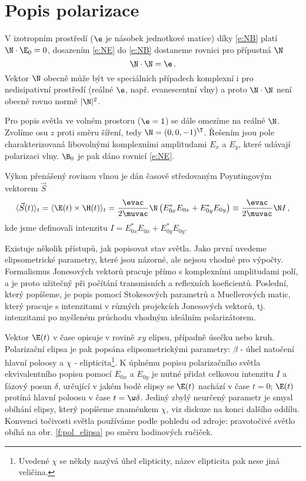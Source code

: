 \section{Popis polarizace}

V izotropním prostředí ($\e$ je násobek jednotkové matice) díky \eqref{e:NB} platí $\N \cdot \E_0=0$, dosazením \eqref{e:NE} do \eqref{e:NB} dostaneme rovnici pro přípustná $\N$
\begin{equation}
\N \cdot \N =\e \,.
\end{equation}
Vektor $\N$ obecně může být ve speciálních případech komplexní i pro nedisipativní prostředí (reálné $\e$, např. evanescentní vlny) a proto $\N \cdot \N$ není obecně rovno normě $|\N|^2$.

Pro popis světla ve volném prostoru ($\e=1$) se dále omezíme na reálné $\N$.
Zvolíme osu $z$ proti směru šíření, tedy $\N=(0,0,-1)^\T$.
Řešením jsou pole charakterizovaná libovolnými komplexními amplitudami $E_x$ a $E_{y}$, které udávají polarizaci vlny.
$\B_0$ je pak dáno rovnicí \eqref{e:NE}.

Výkon přenášený rovinou vlnou je dán časově středovaným Poyntingovým vektorem $\vec{S}$
\begin{equation} \label{e:intenzita}
\langle \vec{S}(t)\rangle_t=\langle\E(t)\times\H(t)\rangle_t=\frac{\evac}{2\muvac}\N \left( E_{0x}^*E_{0x}+E_{0y}^*E_{0y} \right) \equiv \frac{\evac}{2\muvac}\N I\,,
\end{equation}
kde jsme definovali intenzitu $I=E_{0x}^*E_{0x}+E_{0y}^*E_{0y}$.

Existuje několik přístupů, jak popisovat stav světla. Jako první uvedeme elipsometrické parametry, které jsou názorné, ale nejsou vhodné pro výpočty.
Formalismus Jonesových vektorů pracuje přímo s komplexními amplitudami polí, a je proto užitečný při počítání transmisních a reflexních koeficientů.
Poslední, který popíšeme, je popis pomocí Stokesových parametrů a Muellerových matic, který pracuje s intenzitami v různých projekcích Jonesových vektorů, tj. intenzitami po myšleném průchodu vhodným ideálním polarizátorem.

Vektor $\E(t)$ v čase opisuje v rovině $xy$ elipsu, případně úsečku nebo kruh\cite{Bornwolf}.
Polarizační elipsa je pak popsána elipsometrickými parametry: $\beta$ - úhel natočení hlavní poloosy a $\chi$ - elipticita\footnote{Uvedené $\chi$ se někdy nazývá úhel elipticity, název elipticita pak nese jiná veličina.}.
K úplnému popisu polarizačního světla ekvivalentního popisu pomocí $E_{0x}$ a $E_{0y}$ je nutné přidat celkovou intenzitu $I$ a fázový posun $\delta$, určující v jakém bodě elipsy se $\E(t)$ nachází v čase $t=0$; $\E(t)$ protíná hlavní poloosu v čase $t=\w \delta$.
Jediný zbylý neurčený parametr je smysl obíhání elipsy, který popíšeme znaménkem $\chi$, viz diskuze na konci dalšího oddílu.
Konvenci točivosti světla používáme podle pohledu od zdroje: pravotočivé světlo obíhá na obr. \ref{f:pol_elipsa} po směru hodinových ručiček.

